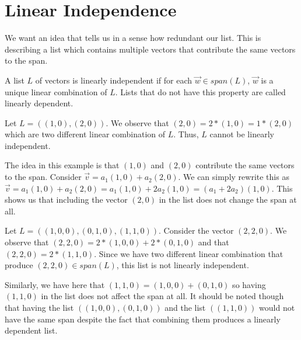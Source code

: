 \section{Linear Independence}
We want an idea that tells us in a sense how redundant our list. This is describing a list which contains multiple vectors that contribute the same vectors to the span.
\begin{definition}
    A list $L$ of vectors is linearly independent if for each $\vec{w}\in span(L)$, $\vec{w}$ is a unique linear combination of $L$. Lists that do not have this property are called linearly dependent.
\end{definition}
\begin{example}
    Let $L=((1,0),(2,0))$. We observe that $(2,0)=2*(1,0)=1*(2,0)$ which are two different linear combination of $L$. Thus, $L$ cannot be linearly independent.
\end{example}
The idea in this example is that $(1,0)$ and $(2,0)$ contribute the same vectors to the span. Consider $\vec{v}=a_1(1,0)+a_2(2,0)$. We can simply rewrite this as $\vec{v}=a_1(1,0)+a_2(2,0)=a_1(1,0)+2a_2(1,0)=(a_1+2a_2)(1,0)$. This shows us that including the vector $(2,0)$ in the list does not change the span at all.
\begin{example}
    Let $L=((1,0,0), (0,1,0), (1,1,0))$. Consider the vector $(2,2,0)$. We observe that $(2,2,0)=2*(1,0,0)+2*(0,1,0)$ and that $(2,2,0)=2*(1,1,0)$. Since we have two different linear combination that produce $(2,2,0)\in span(L)$, this list is not linearly independent.
\end{example}
Similarly, we have here that $(1,1,0)=(1,0,0)+(0,1,0)$ so having $(1,1,0)$ in the list does not affect the span at all. It should be noted though that having the list $((1,0,0),(0,1,0))$ and the list $((1,1,0))$ would not have the same span despite the fact that combining them produces a linearly dependent list.

